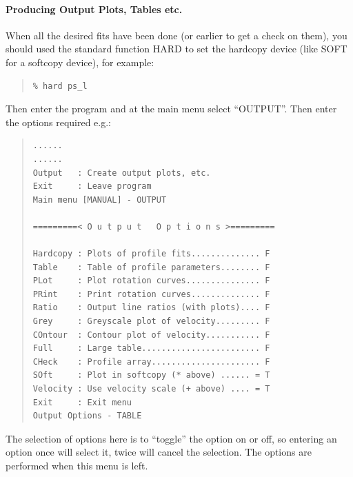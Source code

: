 \paragraph{Producing Output Plots, Tables etc.}
\label{long.out}

When all the desired fits have been done (or earlier to get a check on
them), you should used the standard  function
HARD to set the hardcopy device (like SOFT for a softcopy device), for
example:

\begin{quote}\begin{verbatim}
% hard ps_l
\end{verbatim}\end{quote}

Then enter the program and at the main menu select ``OUTPUT''. Then
enter the options required e.g.:

\begin{quote}\begin{verbatim}
......
......
Output   : Create output plots, etc.
Exit     : Leave program
Main menu [MANUAL] - OUTPUT
 
=========< O u t p u t   O p t i o n s >=========
 
Hardcopy : Plots of profile fits.............. F
Table    : Table of profile parameters........ F
PLot     : Plot rotation curves............... F
PRint    : Print rotation curves.............. F
Ratio    : Output line ratios (with plots).... F
Grey     : Greyscale plot of velocity......... F
COntour  : Contour plot of velocity........... F
Full     : Large table........................ F
CHeck    : Profile array...................... F
SOft     : Plot in softcopy (* above) ...... = T
Velocity : Use velocity scale (+ above) .... = T
Exit     : Exit menu
Output Options - TABLE
\end{verbatim}\end{quote}

The selection of options here is to ``toggle'' the option on or off,
so entering an option once will select it, twice will cancel the
selection. The options are performed when this menu is left.

